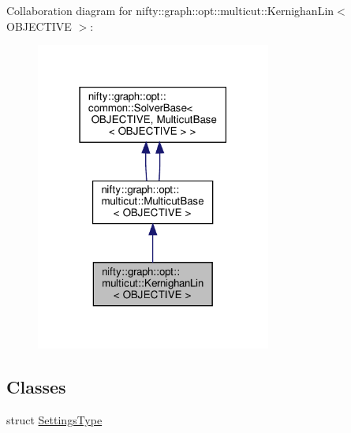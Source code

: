 Collaboration diagram for nifty\+:\+:graph\+:\+:opt\+:\+:multicut\+:\+:Kernighan\+Lin$<$ O\+B\+J\+E\+C\+T\+I\+VE $>$\+:
\nopagebreak
\begin{figure}[H]
\begin{center}
\leavevmode
\includegraphics[width=219pt]{classnifty_1_1graph_1_1opt_1_1multicut_1_1KernighanLin__coll__graph}
\end{center}
\end{figure}
\subsection*{Classes}
\begin{DoxyCompactItemize}
\item 
struct \hyperlink{structnifty_1_1graph_1_1opt_1_1multicut_1_1KernighanLin_1_1SettingsType}{Settings\+Type}
\end{DoxyCompactItemize}
